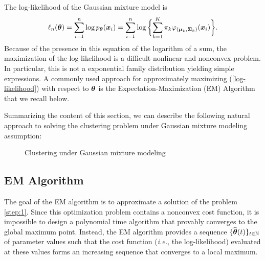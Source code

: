 The log-likelihood of the Gaussian mixture model is
\begin{equation}\label{log-likelihood}
\ell_n({\boldsymbol\theta})=\sum_{i=1}^{n}\log{p_{{\boldsymbol\theta}}(\boldsymbol x_i)}=
\sum_{i=1}^{n}\log\bigg\{{\sum_{k=1}^K\pi_k\varphi_{(\boldsymbol\mu_{k},\boldsymbol\Sigma_{k})}(\boldsymbol x_i)}\bigg\}.
\end{equation}
Because of the presence in this equation of the logarithm of a sum, the maximization of the log-likelihood is
a difficult nonlinear and nonconvex problem. In particular, this is not a exponential family distribution yielding simple expressions.
A commonly used approach for approximately maximizing (\ref{log-likelihood}) with respect to ${\boldsymbol\theta}$ is the Expectation-Maximization
(EM) Algorithm \citep{dempster77} that we recall below.

Summarizing the content of this section, we can describe the following  natural approach to solving the clustering problem under Gaussian
mixture modeling assumption:
\begin{figure}[h]
\begin{center}
   \caption{Clustering under Gaussian mixture modeling}
   \label{algo:general}
\end{center}
\vspace{-15pt}
\end{figure}
\subsection{EM Algorithm}
\label{sec:EM_algo}
The goal of the EM algorithm is to approximate a solution of the problem \eqref{step:1}.
Since this optimization problem contains a nonconvex cost function, it is impossible to
design a polynomial time algorithm that provably converges to the global maximum point. Instead,
the EM algorithm provides a sequence $\{\widehat{{\boldsymbol\theta}}(t)\}_{t\in{\mathbb N}}$ of parameter values such that
the cost function (\textit{i.e.}, the log-likelihood) evaluated at these values forms an
increasing sequence that converges to a local maximum.

